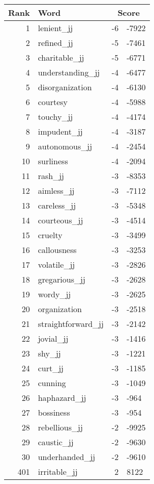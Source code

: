 \begin{longtable}[!htbp]{| rlr@{.}l |}
    \hline
    \textbf{Rank} & \textbf{Word} & \multicolumn{2}{c|}{\textbf{Score}} \\
    \hline
    \endhead
    1 & lenient\_jj & -6 & -7922 \\
    2 & refined\_jj & -5 & -7461 \\
    3 & charitable\_jj & -5 & -6771 \\
    4 & understanding\_jj & -4 & -6477 \\
    5 & disorganization & -4 & -6130 \\
    6 & courtesy & -4 & -5988 \\
    7 & touchy\_jj & -4 & -4174 \\
    8 & impudent\_jj & -4 & -3187 \\
    9 & autonomous\_jj & -4 & -2454 \\
    10 & surliness & -4 & -2094 \\
    11 & rash\_jj & -3 & -8353 \\
    12 & aimless\_jj & -3 & -7112 \\
    13 & careless\_jj & -3 & -5348 \\
    14 & courteous\_jj & -3 & -4514 \\
    15 & cruelty & -3 & -3499 \\
    16 & callousness & -3 & -3253 \\
    17 & volatile\_jj & -3 & -2826 \\
    18 & gregarious\_jj & -3 & -2628 \\
    19 & wordy\_jj & -3 & -2625 \\
    20 & organization & -3 & -2518 \\
    21 & straightforward\_jj & -3 & -2142 \\
    22 & jovial\_jj & -3 & -1416 \\
    23 & shy\_jj & -3 & -1221 \\
    24 & curt\_jj & -3 & -1185 \\
    25 & cunning & -3 & -1049 \\
    26 & haphazard\_jj & -3 & -964 \\
    27 & bossiness & -3 & -954 \\
    28 & rebellious\_jj & -2 & -9925 \\
    29 & caustic\_jj & -2 & -9630 \\
    30 & underhanded\_jj & -2 & -9610 \\
    401 & irritable\_jj & 2 & 8122 \\

\end{longtable}
